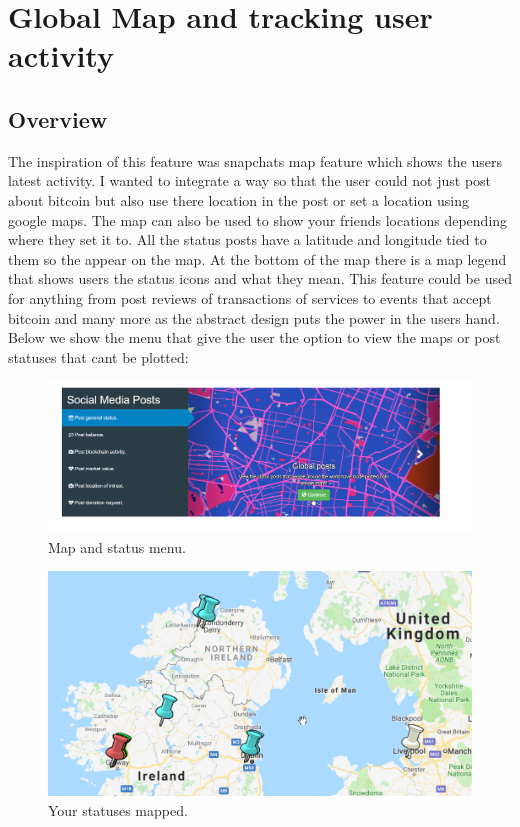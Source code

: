 \section{Global Map and tracking user activity}

\subsection{Overview}
The inspiration of this feature was snapchats map feature which shows the users latest activity. I wanted to integrate a way so that the user could not just post about bitcoin but also use there location in the post or set a location using google maps. The map can also be used to show your friends locations depending where they set it to. All the status posts have a latitude and longitude tied to them so the appear on the map. At the bottom of the map there is a map legend that shows users the status icons and what they mean. This feature could be used for anything from post reviews of transactions of services to events that accept bitcoin and many more as the abstract design puts the power in the users hand. Below we show the menu that give the user the option to view the maps or post statuses that cant be plotted:

\begin{figure}[H]
\centering
\includegraphics[]{img/mapmenu.png}
\caption{Map and status menu.}
\end{figure}

\begin{figure}[H]
\centering
\includegraphics[]{img/map1.png}
\caption{Your statuses mapped.}
\end{figure}

